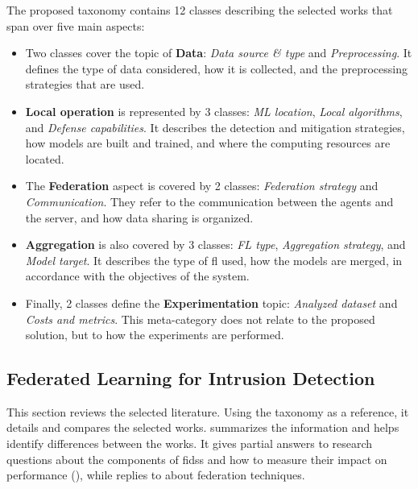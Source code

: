 The proposed taxonomy contains 12 classes describing the selected works that span over five main aspects:
\begin{itemize}
  \item Two classes cover the topic of \textbf{Data}: \emph{Data source \& type} and \emph{Preprocessing}.
  It defines the type of data considered, how it is collected, and the preprocessing strategies that are used.
  
  \item \textbf{Local operation} is represented by 3 classes: \emph{ML location}, \emph{Local algorithms}, and \emph{Defense capabilities}.
  It describes the detection and mitigation strategies, how models are built and trained, and where the computing resources are located.
  
  \item The \textbf{Federation} aspect is covered by 2 classes: \emph{Federation strategy} and \emph{Communication}.
  They refer to the communication between the agents and the server, and how data sharing is organized.
  
  \item \textbf{Aggregation} is also covered by 3 classes: \emph{FL type}, \emph{Aggregation strategy}, and \emph{Model target}.
  It describes the type of \gls{fl} used, how the models are merged, in accordance with the objectives of the system.
  
  \item Finally, 2 classes define the \textbf{Experimentation} topic: \emph{Analyzed dataset} and \emph{Costs and metrics}.
  This meta-category does not relate to the proposed solution, but to how the experiments are performed.
\end{itemize}



\subsection{Federated Learning for Intrusion Detection\label{sec:sota.quali.fids}}

This section reviews the selected literature.
Using the taxonomy as a reference, it details and compares the selected works.
 summarizes the information and helps identify differences between the works.
It gives partial answers to research questions about the components of \glspl{fids} and how to measure their impact on performance (), while  replies to  about federation techniques.


